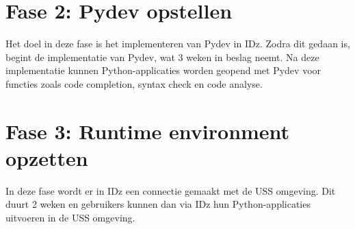 \section{Fase 2: Pydev opstellen}
\label{sec:m-opstellen-pydev}
Het doel in deze fase is het implementeren van Pydev in IDz. Zodra dit gedaan is, begint de implementatie van Pydev, wat 3 weken in beslag neemt. Na deze implementatie kunnen Python-applicaties worden geopend met Pydev voor functies zoals code completion, syntax check en code analyse. 


\section{Fase 3: Runtime environment opzetten}
\label{sec:m-python-interpreter-opzetten}
In deze fase wordt er in IDz een connectie gemaakt met de USS omgeving. Dit duurt 2 weken en gebruikers kunnen dan via IDz hun Python-applicaties uitvoeren in de USS omgeving.
%    


